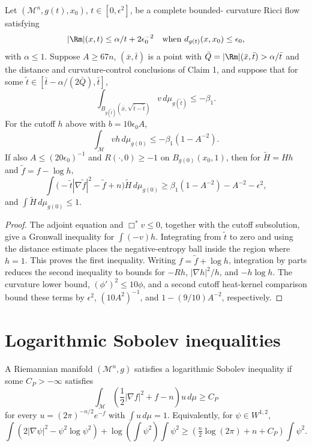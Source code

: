 \begin{lemma}
\label{lem:chow-iii-local-entropy-upper-bound}
Let \((\mathcal M^n,g(t),x_0)\), \(t\in[0,\epsilon^2]\), be a complete bounded-
curvature Ricci flow satisfying
\[
 |\Rm|(x,t)\le\alpha/t+2\epsilon_0^{-2}
\quad\text{when }d_{g(t)}(x,x_0)\le\epsilon_0,
\]
with \(\alpha\le1\).  Suppose \(A\ge67n\), \((\bar x,\bar t)\) is a point
with \(\bar Q=|\Rm|(\bar x,\bar t)>\alpha/\bar t\) and the distance and
curvature-control conclusions of Claim 1, and suppose that for some
\(\tilde t\in[\bar t-\alpha/(2\bar Q),\bar t]\),
\[
 \int_{B_{g(\tilde t)}(\bar x,\sqrt{\bar t-\tilde t})}v\,d\mu_{g(\tilde t)}\le-\beta_1.
\]
For the cutoff \(h\) above with \(b=10\epsilon_0A\),
\[
 \int_{\mathcal M}v h\,d\mu_{g(0)}
 \le-\beta_1(1-A^{-2}).
\]
If also \(A\le(20\epsilon_0)^{-1}\) and \(R(\cdot,0)\ge-1\) on
\(B_{g(0)}(x_0,1)\), then for \(\widetilde H=Hh\) and
\(\widetilde f=f-\log h\),
\[
 \int\bigl(-\tilde t|\nabla\widetilde f|^2-\widetilde f+n\bigr)\widetilde H\,d\mu_{g(0)}
 \ge \beta_1(1-A^{-2})-A^{-2}-\epsilon^2,
\]
and \(\int\widetilde H\,d\mu_{g(0)}\le1\).
\end{lemma}
\begin{proof}
\sketch The adjoint equation and \(\Box^*v\le0\), together with the cutoff
subsolution, give a Gronwall inequality for \(\int(-v)h\).  Integrating from
\(\tilde t\) to zero and using the distance estimate places the negative-entropy
ball inside the region where \(h=1\).  This proves the first inequality.  Writing
\(f=\widetilde f+\log h\), integration by parts reduces the second inequality
to bounds for \(-Rh\), \(|\nabla h|^2/h\), and \(-h\log h\).  The curvature lower bound,
\((\phi')^2\le10\phi\), and a second cutoff heat-kernel comparison bound these
terms by \(\epsilon^2\), \((10A^2)^{-1}\), and \(1-(9/10)A^{-2}\), respectively.
\end{proof}

\section{Logarithmic Sobolev inequalities}

\begin{definition}
\label{def:chow-iii-log-sobolev}
A Riemannian manifold \((\mathcal M^n,g)\) satisfies a logarithmic Sobolev
inequality if some \(C_P>-\infty\) satisfies
\[
 \int_{\mathcal M}\left(\frac12|\nabla f|^2+f-n\right)u\,d\mu\ge C_P
\]
for every \(u=(2\pi)^{-n/2}e^{-f}\) with \(\int u\,d\mu=1\).  Equivalently,
for \(\psi\in W^{1,2}\),
\[
 \int(2|\nabla\psi|^2-\psi^2\log\psi^2)
 +\log\!\left(\int\psi^2\right)\int\psi^2
 \ge\left(\tfrac n2\log(2\pi)+n+C_P\right)\int\psi^2.
\]
\end{definition}

